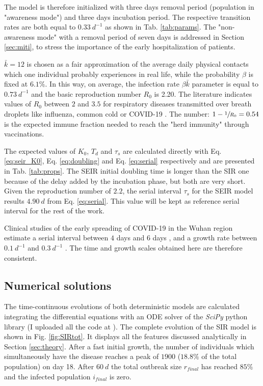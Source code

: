 \documentclass[DIV=12, BCOR=0pt]{scrartcl}  %
\begin{document}
  The model is therefore initialized with three days removal period (population in "awareness mode") and three days incubation period. 
  The respective transition rates are both equal to $0.33 \ d^{-1}$ as shown in Tab. \ref{tab:params}. 
  The "non-awareness mode" with a removal period of seven days is addressed in Section \ref{sec:miti}, to stress the importance of the early hospitalization of patients. 
  
 
  $\bar{k} = 12$ is chosen as a fair approximation of the average daily physical contacts which one individual probably experiences in real life, while the probability $\beta$ is fixed at $6.1 \%$. In this way, on average, the infection rate $\beta \bar{k}$ parameter is equal to $0.73 \ d^{-1}$ and the basic reproduction number $R_0$ is 2.20. The literature indicates values of $R_0$ between $2$ and $3.5$ for respiratory diseases transmitted over breath droplets like influenza, common cold or COVID-19 \citep{Hilton2020, Sanche2020, Firth2020}. 
  The number: $1 - \sfrac{1}{R_0} = 0.54 $ is the expected immune fraction needed to reach the "herd immunity" through vaccinations.
  
  The expected values of $K_0$, $T_d$ and $\tau_s$ are calculated directly with Eq. \ref{eq:seir_K0}, Eq. \ref{eq:doubling} and Eq. \ref{eq:serial} respectively and are presented in Tab. \ref{tab:props}. The SEIR initial doubling time is longer than the SIR one because of the delay added by the incubation phase, but both are very short. Given the reproduction number of $2.2$, the serial interval $\tau_s$ for the SEIR model results $4.90 \ d$ from Eq. \ref{eq:serial}. This value will be kept as reference serial interval for the rest of the work.
  
  Clinical studies of the early spreading of COVID-19 in the Wuhan region estimate a serial interval between $4$ days \citep{Du2020} and $6$ days \citep{Firth2020}, and a growth rate between $0.1 \ d^{-1}$ \citep{Du2020} and $0.3 \ d^{-1}$ \citep{Sanche2020}. The time and growth scales obtained here are therefore consistent.
    
  
  \subsection{Numerical solutions}
	The time-continuous evolutions of both deterministic models are calculated integrating the differential equations with an ODE solver of the \textit{SciPy} python library (I uploaded all the code at \citet{pyndemic}). 	%
	The complete evolution of the SIR model is shown in Fig. \ref{fig:SIRtot}. It displays all the features discussed analytically in Section \ref{sec:theory}. After a fast initial growth, the number of individuals which simultaneously have the disease reaches a peak of $1900$ ($18.8 \%$ of the total population) on day 18. After $60 \ d$ the total outbreak size $r_{final}$ has reached $85 \%$ and the infected population $i_{final}$ is zero.
	
\end{document}

